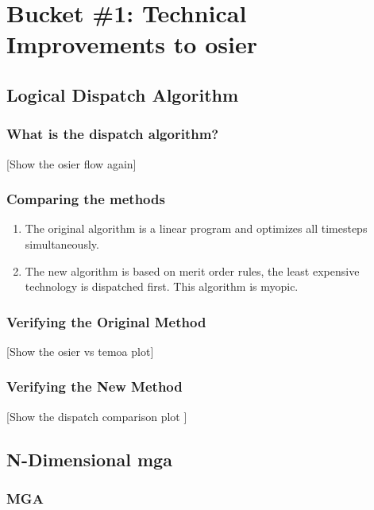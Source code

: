 \section{Bucket \#1: Technical Improvements to \gls{osier}}

\subsection{Logical Dispatch Algorithm}
\begin{frame}
    \frametitle{What is the dispatch algorithm?}

    [Show the osier flow again]

\end{frame}


\begin{frame}
    \frametitle{Comparing the methods}

    \begin{enumerate}
        \item The original algorithm is a linear program and optimizes all
        timesteps simultaneously.
        \item The new algorithm is based on merit order rules, the least
        expensive technology is dispatched first. This algorithm is myopic.
    \end{enumerate}
    
\end{frame}

\begin{frame}
    \frametitle{Verifying the Original Method}

    [Show the osier vs temoa plot]

\end{frame}

\begin{frame}
    \frametitle{Verifying the New Method}

    [Show the dispatch comparison plot ]

\end{frame}

\subsection{N-Dimensional \gls{mga}}

\begin{frame}
    \frametitle{MGA}
\end{frame}